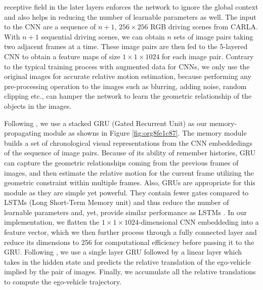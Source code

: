 \documentclass[letterpaper, 12pt]{book}
\theoremstyle{definition}
\theoremstyle{definition}
\theoremstyle{definition}
\theoremstyle{definition}
\theoremstyle{definition}
\begin{document}
receptive field in the later layers enforces the network to ignore the global
context and also helps in reducing the number of learnable parameters as
well. The input to the CNN are a sequence of \(n+1\), \(256 \times 256\) RGB driving
scenes from CARLA. With \(n+1\) sequential driving scenes, we can obtain \(n\)
sets of image pairs taking two adjacent frames at a time. These image pairs are
then fed to the 5-layered CNN to obtain a feature maps of size \(1 \times 1 \times
1024\) for each image pair. Contrary to the typical training process with
augmented data for CNNs, we only use the original images for accurate relative
motion estimation, because performing any pre-processing operation to the images
such as blurring, adding noise, random clipping etc., can hamper the network to
learn the geometric relationship of the objects in the images.

\label{sec:orgf661ae4}
Following \cite{Zhai2019}, we use a stacked GRU (Gated Recurrent Unit)
\cite{Ballas2015} as our memory-propagating module as showns in Figure \ref{fig:org8fe1c87}. The
memory module builds a set of chronological visual representations from the CNN
embeddedings of the sequence of image pairs. Because of its ability of remember
histories, GRU can capture the geometric relationships coming from the previous
frames of images, and then estimate the relative motion for the current frame
utilizing the geometric constraint within multiple frames. Also, GRUs are
appropriate for this module as they are simple yet powerful. They contain fewer
gates compared to LSTMs (Long Short-Term Memory unit) and thus reduce the number
of learnable parameters and, yet, provide similar performance as LSTMs
\cite{Chung2014}. In our implementation, we flatten the \(1 \times 1 \times
1024\)-dimensional CNN embeddeding into a feature vector, which we then further
process through a fully connected layer and reduce its dimensions to 256 for
computational efficiency before passing it to the GRU. Following
\cite{Filos2020}, we use a single layer GRU followed by a linear layer which
takes in the hidden state and predicts the relative translation of the
ego-vehicle implied by the pair of images. Finally, we accumulate all the
relative translations to compute the ego-vehicle trajectory.
\end{document}
